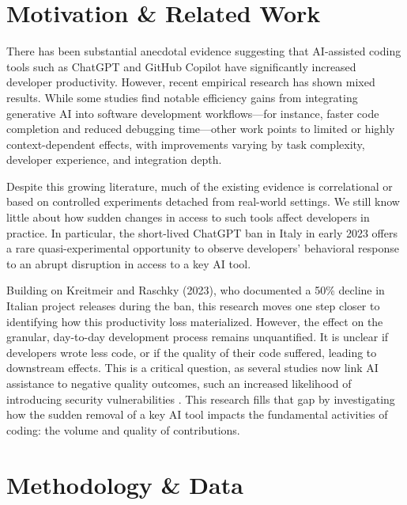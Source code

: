 \section*{Motivation \& Related Work}

There has been substantial anecdotal evidence suggesting that AI-assisted coding tools such as ChatGPT \cite{openai_chatgpt} and GitHub Copilot have significantly increased developer productivity. However, recent empirical research has shown mixed results\cite{cui2025the, paradis2024doesaiimpactdevelopment, peng2023impactaideveloperproductivity}. While some studies find notable efficiency gains from integrating generative AI into software development workflows—for instance, faster code completion and reduced debugging time—other work points to limited or highly context-dependent effects, with improvements varying by task complexity, developer experience, and integration depth.

Despite this growing literature, much of the existing evidence is correlational or based on controlled experiments detached from real-world settings. We still know little about how sudden changes in access to such tools affect developers in practice. In particular, the short-lived ChatGPT ban in Italy in early 2023 \cite{garante_ban_2023} offers a rare quasi-experimental opportunity to observe developers’ behavioral response to an abrupt disruption in access to a key AI tool.

Building on Kreitmeir and Raschky (2023)\cite{Kreitmeir2023}, who documented a 50\% decline in Italian project releases during the ban, this research moves one step closer to identifying how this productivity loss materialized. However, the effect on the granular, day-to-day development process remains unquantified. It is unclear if developers wrote less code, or if the quality of their code suffered, leading to downstream effects. This is a critical question, as several studies now link AI assistance to negative quality outcomes, such an increased likelihood of introducing security vulnerabilities \cite{fu2025securityweaknessescopilotgeneratedcode, pearce2021asleepkeyboardassessingsecurity}. This research fills that gap by investigating how the sudden removal of a key AI tool impacts the fundamental activities of coding: the volume and quality of contributions.


\section*{Methodology \& Data}

